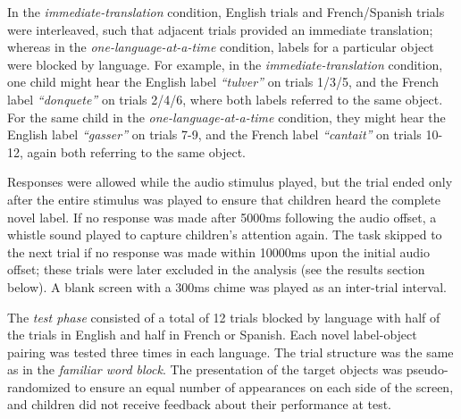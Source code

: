\documentclass[
  man,floatsintext]{apa7}
\begin{document}
In the \emph{immediate-translation} condition, English trials and French/Spanish trials were interleaved, such that adjacent trials provided an immediate translation; whereas in the \emph{one-language-at-a-time} condition, labels for a particular object were blocked by language. For example, in the \emph{immediate-translation} condition, one child might hear the English label \emph{``tulver''} on trials 1/3/5, and the French label \emph{``donquete''} on trials 2/4/6, where both labels referred to the same object. For the same child in the \emph{one-language-at-a-time} condition, they might hear the English label \emph{``gasser''} on trials 7-9, and the French label \emph{``cantait''} on trials 10-12, again both referring to the same object.

Responses were allowed while the audio stimulus played, but the trial ended only after the entire stimulus was played to ensure that children heard the complete novel label. If no response was made after 5000ms following the audio offset, a whistle sound played to capture children's attention again. The task skipped to the next trial if no response was made within 10000ms upon the initial audio offset; these trials were later excluded in the analysis (see the results section below). A blank screen with a 300ms chime was played as an inter-trial interval.

The \emph{test phase} consisted of a total of 12 trials blocked by language with half of the trials in English and half in French or Spanish. Each novel label-object pairing was tested three times in each language. The trial structure was the same as in the \emph{familiar word block}. The presentation of the target objects was pseudo-randomized to ensure an equal number of appearances on each side of the screen, and children did not receive feedback about their performance at test.
\end{document}
